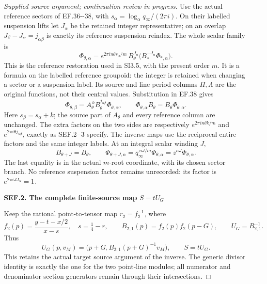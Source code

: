 \begin{proof}[Supplied source argument; continuation review in progress]
Use the actual reference sectors of EF.36-\/-38, with
\(s_\alpha=\log_\alpha q_\infty/(2\pi i)\). On their labelled
suspension lifts let \(J_\alpha\) be the retained integer representative;
on an overlap \(J_\beta-J_\alpha=j_{\alpha\beta}\) is exactly its
reference suspension reindex. The whole scalar family is
\[
 \Phi_{\theta,\alpha}
 =e^{2\pi i n\theta s_\alpha/m}\,
 B_\theta^{J_\alpha}
       \bigl(B_*^{-J_\alpha}\Phi_{*,\alpha}\bigr).
 \tag{SEF.3}
\]
This is the reference restoration used in SI3.5, with the present
order \(m\). It is a formula on the labelled reference groupoid:
the integer is retained when changing a sector or a suspension label.
Its source and line period columns \(\Pi,\Lambda\) are the original
functions, not their central values. Substitution in EF.38 gives
\[
 \Phi_{\theta,\beta}
  =A_\theta^{\,k}B_\theta^{j_{\alpha\beta}}\Phi_{\theta,\alpha},
 \qquad
 \Phi_{\theta,\alpha}B_\theta=B_\theta\Phi_{\theta,\alpha}.
 \tag{SEF.4}
\]
Here \(s_\beta=s_\alpha+k\); the source part of \(A_\theta\) and every
reference column are unchanged. The extra factors on the two sides
are respectively \(e^{2\pi i n\theta k/m}\) and
\(e^{2\pi i\theta j_{\alpha\beta}}\), exactly as SEF.2-\/-3 specify.
The inverse maps use the reciprocal entire factors and the same
integer labels. At an integral scalar winding \(J\),
\[
 B_{\theta+J}=B_\theta,\qquad
 \Phi_{\theta+J,\alpha}
       =q_\infty^{\,nJ/m}\Phi_{\theta,\alpha}
       =z^{nJ}\Phi_{\theta,\alpha}.
 \tag{SEF.5}
\]
The last equality is in the actual \(m\)-root coordinate, with its
chosen sector branch. No reference suspension factor remains
unrecorded: its factor is \(e^{2\pi iJJ_\alpha}=1\).

\par

\medskip\noindent\textbf{SEF.2. The complete finite-source map \(S=tU_G\)}

\par\nobreak

Keep the rational point-to-tensor map \(r_2=f_2^{-1}\), where
\[
 f_2(p)=\frac{y-t-x/2}{x-s},\quad s=\tfrac14-r,\qquad
 B_{2,1}(p)=f_2(p)f_2(p-G),\qquad U_G=B_{2,1}^{-1}.
 \tag{SEF.6}
\]
Thus
\[
 U_G(p,v_M)=\bigl(p+G,B_{2,1}(p+G)^{-1}v_M\bigr),\qquad
                         S=tU_G.
 \tag{SEF.7}
\]
This retains the actual target source argument of the inverse.
The generic divisor identity is exactly the one for the two point-line
modules; all numerator and denominator section generators remain
through their intersections.


\end{proof}
